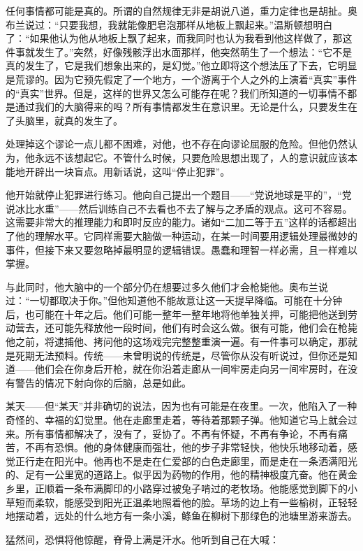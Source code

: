 任何事情都可能是真的。所谓的自然规律无非是胡说八道，重力定律也是胡扯。奥布兰说过：``只要我想，我就能像肥皂泡那样从地板上飘起来。''温斯顿想明白了：``如果他认为他从地板上飘了起来，而我同时也认为我看到他这样做了，那这件事就发生了。''突然，好像残骸浮出水面那样，他突然萌生了一个想法：``它不是真的发生了，它是我们想象出来的，是幻觉。''他立即将这个想法压了下去，它明显是荒谬的。因为它预先假定了一个地方，一个游离于个人之外的上演着``真实''事件的``真实''世界。但是，这样的世界又怎么可能存在呢？我们所知道的一切事情不都是通过我们的大脑得来的吗？所有事情都发生在意识里。无论是什么，只要发生在了头脑里，就真的发生了。

处理掉这个谬论一点儿都不困难，对他，也不存在向谬论屈服的危险。但他仍然认为，他永远不该想起它。不管什么时候，只要危险思想出现了，人的意识就应该本能地开辟出一块盲点。用新话说，这叫``停止犯罪''。

他开始就停止犯罪进行练习。他向自己提出一个题目——``党说地球是平的''，``党说冰比水重''——然后训练自己不去看也不去了解与之矛盾的观点。这可不容易。这需要非常大的推理能力和即时反应的能力。诸如``二加二等于五''这样的话都超出了他的理解水平。它同样需要大脑做一种运动，在某一时间要用逻辑处理最微妙的事件，但接下来又要忽略掉最明显的逻辑错误。愚蠢和理智一样必需，且一样难以掌握。

与此同时，他大脑中的一个部分仍在想要过多久他们才会枪毙他。奥布兰说过：``一切都取决于你。''但他知道他不能故意让这一天提早降临。可能在十分钟后，也可能在十年之后。他们可能一整年一整年地将他单独关押，可能把他送到劳动营去，还可能先释放他一段时间，他们有时会这么做。很有可能，他们会在枪毙他之前，将逮捕他、拷问他的这场戏完完整整重演一遍。有一件事可以确定，那就是死期无法预料。传统——未曾明说的传统是，尽管你从没有听说过，但你还是知道——他们会在你身后开枪，就在你沿着走廊从一间牢房走向另一间牢房时，在没有警告的情况下射向你的后脑，总是如此。

某天——但``某天''并非确切的说法，因为也有可能是在夜里。一次，他陷入了一种奇怪的、幸福的幻觉里。他在走廊里走着，等待着那颗子弹。他知道它马上就会过来。所有事情都解决了，没有了，妥协了。不再有怀疑，不再有争论，不再有痛苦，不再有恐惧。他的身体健康而强壮，他的步子非常轻快，他快乐地移动着，感觉正行走在阳光中。他再也不是走在仁爱部的白色走廊里，而是走在一条洒满阳光的、足有一公里宽的道路上。似乎因为药物的作用，他的精神极度亢奋。他在黄金乡里，正顺着一条布满脚印的小路穿过被兔子啃过的老牧场。他能感觉到脚下的小草短而柔软，能感受到阳光正温柔地照着他的脸。草场的边上有一些榆树，正轻轻地摆动着，远处的什么地方有一条小溪，鲦鱼在柳树下那绿色的池塘里游来游去。

猛然间，恐惧将他惊醒，脊骨上满是汗水。他听到自己在大喊：


